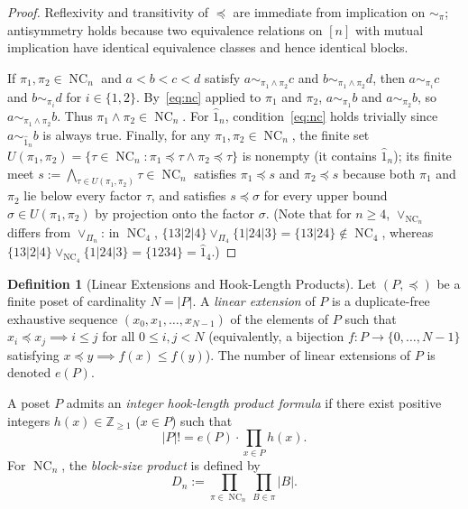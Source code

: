 \documentclass[11pt]{article}
\theoremstyle{definition}
\newtheorem{definition}[theorem]{Definition}
\newcommand{\NC}{\operatorname{NC}}
\begin{document}
\begin{proof}
Reflexivity and transitivity of $\preceq$ are immediate from implication on
$\sim_\pi$; antisymmetry holds because two equivalence relations on $[n]$ with mutual
implication have identical equivalence classes and hence identical blocks.

If $\pi_1, \pi_2 \in \NC_n$ and $a < b < c < d$ satisfy $a \sim_{\pi_1 \wedge \pi_2} c$
and $b \sim_{\pi_1 \wedge \pi_2} d$, then $a \sim_{\pi_i} c$ and $b \sim_{\pi_i} d$ for
$i \in \{1, 2\}$. By~\eqref{eq:nc} applied to $\pi_1$ and $\pi_2$, $a \sim_{\pi_1} b$ and
$a \sim_{\pi_2} b$, so $a \sim_{\pi_1 \wedge \pi_2} b$. Thus $\pi_1 \wedge \pi_2 \in
\NC_n$. For $\hat{1}_n$, condition~\eqref{eq:nc} holds trivially since $a \sim_{\hat{1}_n}
b$ is always true. Finally, for any $\pi_1, \pi_2 \in \NC_n$, the finite set $U(\pi_1,
\pi_2) = \{\tau \in \NC_n : \pi_1 \preceq \tau \land \pi_2 \preceq \tau\}$ is nonempty
(it contains $\hat{1}_n$); its finite meet $s := \bigwedge_{\tau \in U(\pi_1, \pi_2)}
\tau \in \NC_n$ satisfies $\pi_1 \preceq s$ and $\pi_2 \preceq s$ because both $\pi_1$
and $\pi_2$ lie below every factor $\tau$, and satisfies $s \preceq \sigma$ for every
upper bound $\sigma \in U(\pi_1, \pi_2)$ by projection onto the factor $\sigma$. (Note
that for $n \ge 4$, $\vee_{\NC_n}$ differs from $\vee_{\Pi_n}$: in $\NC_4$,
$\{13|2|4\} \vee_{\Pi_4} \{1|24|3\} = \{13|24\} \notin \NC_4$, whereas
$\{13|2|4\} \vee_{\NC_4} \{1|24|3\} = \{1234\} = \hat{1}_4$.)
\end{proof}

\begin{definition}[Linear Extensions and Hook-Length Products]\label{def:linext}
Let $(P, \preceq)$ be a finite poset of cardinality $N = |P|$. A \emph{linear extension}
of $P$ is a duplicate-free exhaustive sequence $(x_0, x_1, \dots, x_{N-1})$ of the
elements of $P$ such that $x_i \preceq x_j \implies i \le j$ for all $0 \le i, j < N$
(equivalently, a bijection $f : P \to \{0, \dots, N-1\}$ satisfying $x \preceq y \implies
f(x) \le f(y)$). The number of linear extensions of $P$ is denoted $e(P)$.

A poset $P$ admits an \emph{integer hook-length product formula} if there exist positive
integers $h(x) \in \mathbb{Z}_{\ge 1}$ ($x \in P$) such that
\begin{equation}\label{eq:hook}
  |P|! = e(P) \cdot \prod_{x \in P} h(x).
\end{equation}
For $\NC_n$, the \emph{block-size product} is defined by
\begin{equation}\label{eq:dn}
  D_n := \prod_{\pi \in \NC_n} \prod_{B \in \pi} |B|.
\end{equation}
\end{definition}
\end{document}
